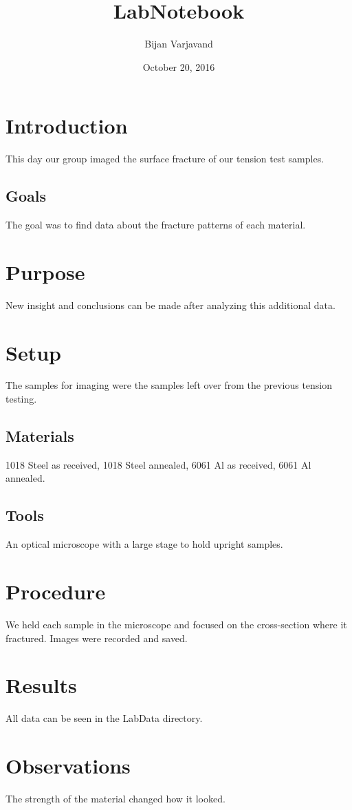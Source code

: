 \documentclass{article}
\author{Bijan Varjavand}
\title{LabNotebook}
\date{October 20, 2016}
\begin{document}
\maketitle

\section{Introduction}

This day our group imaged the surface fracture of our tension test samples.
\subsection{Goals}

The goal was to find data about the fracture patterns of each material.
\section{Purpose}

New insight and conclusions can be made after analyzing this additional data.
\section{Setup}

The samples for imaging were the samples left over from the previous tension testing.
\subsection{Materials}

1018 Steel as received, 1018 Steel annealed, 6061 Al as received, 6061 Al annealed.
\subsection{Tools}

An optical microscope with a large stage to hold upright samples.
\section{Procedure}

We held each sample in the microscope and focused on the cross-section where it fractured. Images were recorded and saved.
\section{Results}

All data can be seen in the LabData directory.
\section{Observations}

The strength of the material changed how it looked.
\end{document}
